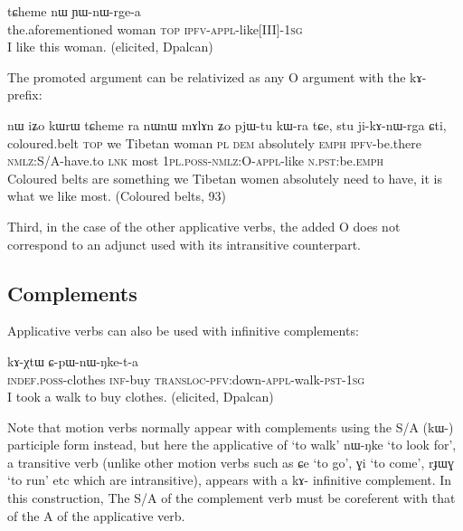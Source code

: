 \documentclass[oldfontcommands,twoside,a4paper,12pt]{article}
\newcommand{\ipa}[1]{{\phon \mbox{#1}}} %
\newcommand{\appl}{\textsc{appl}}
\newcommand{\aor}{\textsc{pfv}}
\newcommand{\dem}{\textsc{dem}}
\newcommand{\emphat}{\textsc{emph}}
\newcommand{\inftv}{\textsc{inf}}
\newcommand{\ipf}{\textsc{ipfv}}
\newcommand{\neu}{\textsc{indef.poss}}
\newcommand{\nmlz}{\textsc{nmlz}}
\newcommand{\npst}{\textsc{n.pst}}
\newcommand{\pl}{\textsc{pl}}
\newcommand{\poss}{\textsc{poss}}
\newcommand{\pst}{\textsc{pst}}
\newcommand{\sg}{\textsc{sg}}
\newcommand{\topic}{\textsc{top}}
\newcommand{\transloc}{\textsc{transloc}}
\begin{document}
 \begin{exe}
   \ex \label{ex:nWrga}
\gll \ipa{iɕqha} 	\ipa{tɕheme} 	\ipa{nɯ}  	\ipa{ɲɯ-nɯ-rge-a}   \\
the.aforementioned woman \topic{}  \textsc{ipfv-appl}-like[III]-1\textsc{sg}     \\
 \glt  I like this woman. (elicited, Dpalcan)
   \end{exe} 

The promoted argument can be relativized  as any O argument with the \ipa{kɤ-} prefix:
     \begin{exe}
   \ex 
\gll  \ipa{thaχtsa} 	\ipa{nɯ} 	\ipa{iʑo} 	\ipa{kɯrɯ} 	\ipa{tɕheme} 	\ipa{ra} 	\ipa{nɯnɯ} 	\ipa{mɤlɤn} 	\ipa{ʑo} 	\ipa{pjɯ-tu} 	\ipa{kɯ-ra} 	\ipa{tɕe}, \ipa{stu} 	\ipa{ji-kɤ-nɯ-rga} 	\ipa{ɕti,}   \\
     coloured.belt \topic{} we Tibetan woman \pl{} \dem{} absolutely \emphat{} \ipf{}-be.there \nmlz{}:S/A-have.to \textsc{lnk} most 1\pl{}.\poss{}-\nmlz{}:O-\appl{}-like \npst{}:be.\emphat{}\\
 \glt  Coloured belts are something we Tibetan women absolutely need to have, it is what we like most. (Coloured belts, 93)
   \end{exe} 
   
  Third, in the case of the other applicative verbs, the added O does not correspond to an adjunct used with its intransitive counterpart.
   \subsection{Complements}
Applicative verbs can also be used with infinitive complements:
     \begin{exe}
   \ex 
\gll  \ipa{tɯ-ŋga} 	\ipa{kɤ-χtɯ} 	\ipa{ɕ-pɯ-nɯ-ŋke-t-a}  \\
  \neu{}-clothes \inftv{}-buy \transloc{}-\aor{}:down-\appl{}-walk-\pst{}-1\sg{}\\
 \glt   I took a walk to buy clothes. (elicited, Dpalcan)
   \end{exe} 
Note that motion verbs normally appear with complements using the S/A (\ipa{kɯ-}) participle form instead, but here the applicative of `to walk' \ipa{nɯ-ŋke} `to look for', a transitive verb (unlike other motion verbs such as \ipa{ɕe} `to go', \ipa{ɣi} `to come', \ipa{rɟɯɣ} `to run' etc which are intransitive), appears with a \ipa{kɤ-} infinitive complement. In this construction, The S/A of the complement verb must be coreferent with that of the A of the applicative verb.
 
\end{document}
